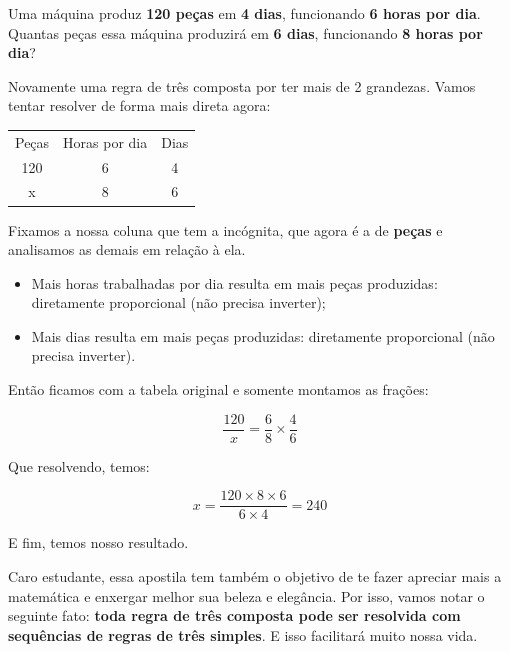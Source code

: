 \begin{exemplo}
    Uma máquina produz \textbf{120 peças} em \textbf{4 dias}, funcionando \textbf{6 horas por dia}. Quantas peças essa máquina produzirá em \textbf{6 dias}, funcionando \textbf{8 horas por dia}?

    \vspace{0.5cm}

    Novamente uma regra de três composta por ter mais de 2 grandezas. Vamos tentar resolver de forma mais direta agora:

    \begin{table}[H]
        \centering
        \begin{tabular}{ccc}
           Peças & Horas por dia & Dias \\
           120 & 6 & 4\\
           x & 8 & 6
        \end{tabular}

    \end{table}

    Fixamos a nossa coluna que tem a incógnita, que agora é a de \textbf{peças} e analisamos as demais em relação à ela.

    \begin{itemize}
        \item Mais horas trabalhadas por dia resulta em mais peças produzidas: diretamente proporcional (não precisa inverter);
        \item Mais dias resulta em mais peças produzidas: diretamente proporcional (não precisa inverter).
    \end{itemize}

    Então ficamos com a tabela original e somente montamos as frações:

    \begin{equation}
        \frac{120}{x}=\frac{6}{8}\times\frac{4}{6}
    \end{equation}

    Que resolvendo, temos:

    \begin{equation}
        x=\frac{120\times8\times6}{6\times4}=240
    \end{equation}

    E fim, temos nosso resultado.
\end{exemplo}

\begin{tcolorbox}[title = IMPORTANTE]
    Caro estudante, essa apostila tem também o objetivo de te fazer apreciar mais a matemática e enxergar melhor sua beleza e elegância. Por isso, vamos notar o seguinte fato: \textbf{toda regra de três composta pode ser resolvida com sequências de regras de três simples}. E isso facilitará muito nossa vida.
\end{tcolorbox}

